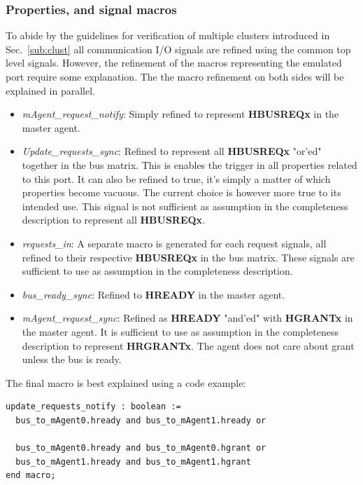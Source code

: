 \subsubsection{Properties, and signal macros}
To abide by the guidelines for verification of multiple clusters introduced in Sec.~\ref{sub:clust} all communication I/O signals are refined using the common
top level signals. However, the refinement of the macros representing the emulated port require some explanation. The the macro refinement on both sides will be explained in parallel. 
\begin{itemize}
 \item \textit{mAgent\_request\_notify}: Simply refined to represent \textbf{HBUSREQx} in the master agent.
 \item \textit{Update\_requests\_sync}: Refined to represent all \textbf{HBUSREQx} "or'ed" together in the bus matrix. This is enables the trigger in all properties related to this port. It can also be refined to true, it's simply a matter of which properties become vacuous. The current choice is however more true
to its intended use. This signal is not sufficient as assumption in the completeness description to represent all \textbf{HBUSREQx}.
 \item \textit{requests\_in}: A separate macro is generated for each request signals, all refined to their respective \textbf{HBUSREQx} in the bus matrix. These signals are sufficient to use as assumption in the completeness description.  
 \item \textit{bus\_ready\_sync}: Refined to \textbf{HREADY} in the master agent. 
 \item \textit{mAgent\_request\_sync}: Refined as \textbf{HREADY} "and'ed" with \textbf{HGRANTx} in the master agent. It is sufficient to use as assumption in the completeness description to represent \textbf{HRGRANTx}. The agent does not care about grant unless the bus is ready. 
\end{itemize} 

The final macro is best explained using a code example:\\
\begin{lstlisting}
update_requests_notify : boolean := 
  bus_to_mAgent0.hready and bus_to_mAgent1.hready or
  
  bus_to_mAgent0.hready and bus_to_mAgent0.hgrant or
  bus_to_mAgent1.hready and bus_to_mAgent1.hgrant
end macro;
\end{lstlisting}

